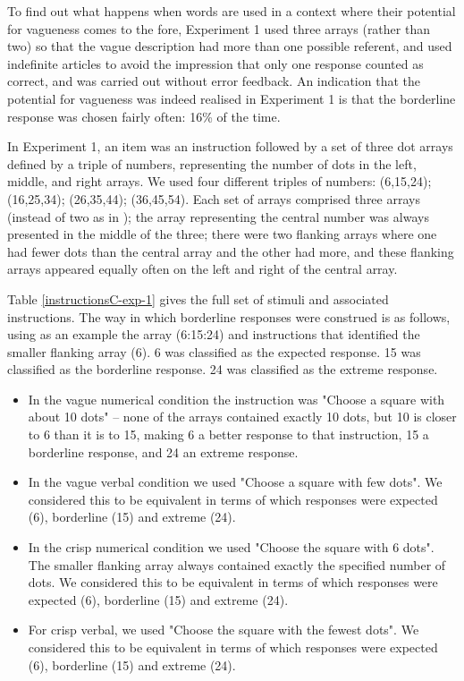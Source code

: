 
To find out what happens when words are used in a context where their potential for vagueness comes to the fore, Experiment 1 used three arrays (rather than two) so that the vague description had more than one possible referent, and used indefinite articles to avoid the impression that only one response counted as correct, and was carried out without error feedback. An indication that the potential for vagueness was indeed realised in Experiment 1 is that the borderline response was chosen fairly often: 16\% of the time.

In Experiment 1, an item was an instruction followed by a set of three dot arrays defined by a triple of numbers, representing the number of dots in the left, middle, and right arrays. We used four different triples of numbers: (6,15,24); (16,25,34); (26,35,44); (36,45,54). Each set of arrays comprised three arrays (instead of two as in \citet{green2013utility}); the array representing the central number was always presented in the middle of the three; there were two flanking arrays where one had fewer dots than the central array and the other had more, and these flanking arrays appeared equally often on the left and right of the central array. 

Table \ref{instructionsC-exp-1} gives the full set of stimuli and associated instructions. The way in which borderline responses were construed is as follows, using as an example the array (6:15:24) and instructions that identified the smaller flanking array (6). 6 was classified as the expected response. 15 was classified as the borderline response. 24 was classified as the extreme response. 

\begin{itemize}
\item In the vague numerical condition the instruction was "Choose a square with about 10 dots" -- none of the arrays contained exactly 10 dots, but 10 is closer to 6 than it is to 15, making 6 a better response to that instruction, 15 a borderline response, and 24 an extreme response. 
\item In the vague verbal condition we used "Choose a square with few dots". We considered this to be equivalent in terms of which responses were expected (6), borderline (15) and extreme (24).
\item In the crisp numerical condition we used "Choose the square with 6 dots". The smaller flanking array always contained exactly the specified number of dots. We considered this to be equivalent in terms of which responses were expected (6), borderline (15) and extreme (24).
\item For crisp verbal, we used "Choose the square with the fewest dots". We considered this to be equivalent in terms of which responses were expected (6), borderline (15) and extreme (24).
\end{itemize}


